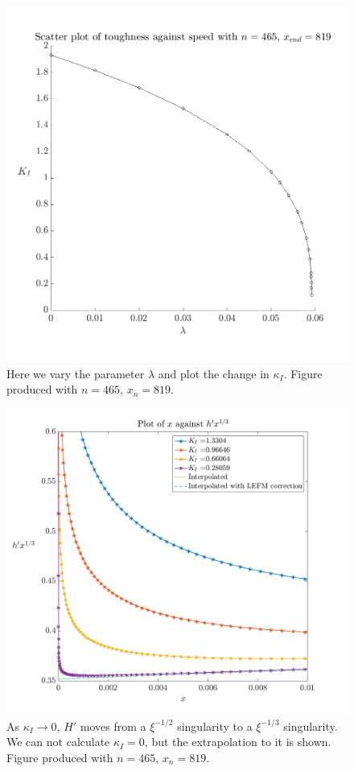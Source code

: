 \documentclass{jfm}
\begin{document}
\begin{figure}
  \centerline{\includegraphics[scale=0.3]{./../../Graphs/K-lambda.png}}
  \caption{Here we vary the parameter $\lambda$ and plot the change in 
           $\kappa_I$. Figure produced with $n=465$, $x_n = 819$.}
\end{figure}
\begin{figure}
  \centerline{\includegraphics[scale=0.3]{./../../Graphs/hprime-x.png}}
  \caption{As $\kappa_I\to 0$, $H'$ moves from a $\xi^{-1/2}$ singularity
           to a $\xi^{-1/3}$ singularity. We can not calculate $\kappa_I=0$, 
           but the extrapolation to it is shown. Figure produced with $n=465$, 
           $x_n = 819$.}
\end{figure}
\end{document}
